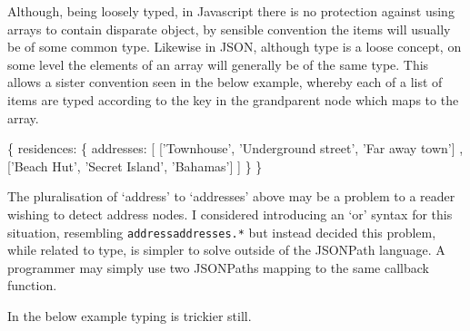 \documentclass[]{article}
\newenvironment{Shaded}{}{}
\newcommand{\DataTypeTok}[1]{\textcolor[rgb]{0.56,0.13,0.00}{{#1}}}
\newcommand{\StringTok}[1]{\textcolor[rgb]{0.25,0.44,0.63}{{#1}}}
\newcommand{\NormalTok}[1]{{#1}}
\begin{document}
Although, being loosely typed, in Javascript there is no protection
against using arrays to contain disparate object, by sensible convention
the items will usually be of some common type. Likewise in JSON,
although type is a loose concept, on some level the elements of an array
will generally be of the same type. This allows a sister convention seen
in the below example, whereby each of a list of items are typed
according to the key in the grandparent node which maps to the array.

\begin{Shaded}
\begin{Highlighting}[]
\NormalTok{\{}
   \DataTypeTok{residences}\NormalTok{: \{}
      \DataTypeTok{addresses}\NormalTok{: [}
         \NormalTok{[}\StringTok{'Townhouse'}\NormalTok{, }\StringTok{'Underground street'}\NormalTok{, }\StringTok{'Far away town'}\NormalTok{]      }
      \NormalTok{,  [}\StringTok{'Beach Hut'}\NormalTok{, }\StringTok{'Secret Island'}\NormalTok{, }\StringTok{'Bahamas'}\NormalTok{]}
      \NormalTok{]}
   \NormalTok{\}}
\NormalTok{\}}
\end{Highlighting}
\end{Shaded}

The pluralisation of `address' to `addresses' above may be a problem to
a reader wishing to detect address nodes. I considered introducing an
`or' syntax for this situation, resembling
\texttt{address\textbar{}addresses.*} but instead decided this problem,
while related to type, is simpler to solve outside of the JSONPath
language. A programmer may simply use two JSONPaths mapping to the same
callback function.

In the below example typing is trickier still.
\end{document}
